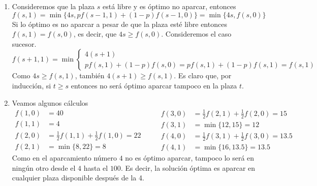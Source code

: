 \documentclass[twoside]{article}
\begin{document}
\begin{ejercicio}{1}
\begin{solucion}
\begin{enumerate}
\item Consideremos que la plaza $s$ está libre y es óptimo no aparcar, entonces
$$f(s,1)=\min{\{4s,pf(s-1,1)+(1-p)f(s-1,0)\}}=\min{\{4s,f(s,0)\}}$$
Si lo óptimo es no aparcar a pesar de que la plaza esté libre entonces $f(s,1)=f(s,0)$, es decir, que $4s\geq f(s,0)$. Consideremos el caso sucesor. 
$$f(s+1,1)=\min\begin{cases}
4(s+1)\\
pf(s,1)+(1-p)f(s,0)=pf(s,1)+(1-p)f(s,1)=f(s,1)
\end{cases}$$
Como $4s\geq f(s,1)$, también $4(s+1)\geq f(s,1)$. Es claro que, por inducción, si $t\geq s$ entonces no será óptimo aparcar tampoco en la plaza $t$.

\item Veamos algunos cálculos
\begin{equation*}
  \begin{split}
    f(1,0)&=40\\
    f(1,1)&= 4\\
    f(2,0)&= \frac{1}{2}f(1,1)+\frac{1}{2}f(1,0)=22\\
    f(2,1)& = \min{\{8,22\}}= 8
  \end{split}
\quad\quad
  \begin{split}
    f(3,0)&=\frac{1}{2}f(2,1)+\frac{1}{2}f(2,0) = 15\\
    f(3,1)&=\min\{12,15\}=12\\
    f(4,0)& = \frac{1}{2}f(3,1)+\frac{1}{2}f(3,0)=13.5\\
    f(4,1)&= \min\{16,13.5\} = 13.5
  \end{split}
\end{equation*}
Como en el aparcamiento número $4$ no es óptimo aparcar, tampoco lo será en ningún otro desde el $4$ hasta el $100$. Es decir, la solución óptima es aparcar en cualquier plaza disponible después de la 4.


\end{enumerate}
\end{solucion}
\end{ejercicio}
\end{document}
